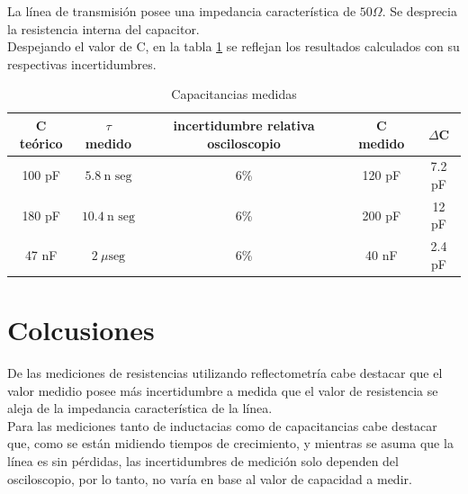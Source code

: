 \documentclass[a4paper,10pt]{article}
\begin{document}
	\indent La línea de transmisión posee una impedancia característica de 
	$50\Omega$. Se desprecia la resistencia interna del capacitor. \\
	\indent Despejando el valor de C, en la tabla \ref{tab002} se reflejan los 
	resultados calculados con su respectivas incertidumbres. \\

		\begin{table}[!htp]
			\centering
			\begin{tabular}{|c|c|c|c|c|}
				\hline
    			C teórico & $\tau$ medido & incertidumbre relativa osciloscopio 
				& C medido & $\Delta$C \\
				\hline
				100 pF & $5.8~\text{n seg}$ & 6\% & 120 pF & 7.2 pF \\
				\hline 
				180 pF & $10.4~\text{n seg}$ & 6\% & 200 pF & 12 pF \\
				\hline
				47 nF & $2~\mu\text{seg}$ & 6\% & 40 nF & 2.4 pF \\
				\hline
			\end{tabular}
			\caption{Capacitancias medidas} 
			\label{tab002} 
		\end{table}

	\newpage
	\section{Colcusiones}
	\indent De las mediciones de resistencias utilizando reflectometría cabe 
	destacar que el valor medidio posee más incertidumbre a medida que el 
	valor de resistencia se aleja de la impedancia característica de la línea.
	\\
	\indent Para las mediciones tanto de inductacias como de capacitancias 
	cabe destacar que, como se están midiendo tiempos de crecimiento, y 
	mientras se	asuma que la línea es sin pérdidas, las incertidumbres de 
	medición solo dependen del osciloscopio, por lo tanto, no varía en base al
	valor de capacidad a medir.\\
\end{document}
